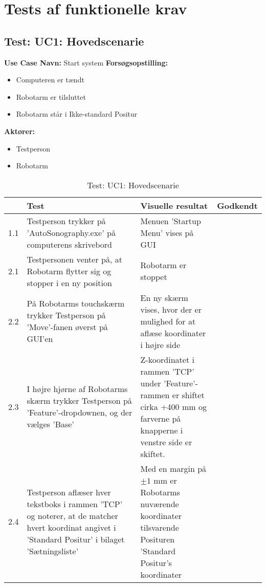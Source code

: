 \chapter{Tests af funktionelle krav}\label{Funktionellekrav}

\section{Test: UC1: Hovedscenarie}
\textbf{Use Case Navn:} Start system \newline
\textbf{Forsøgsopstilling:}
\begin{itemize}
\item Computeren er tændt
\item Robotarm er tilsluttet
\item Robotarm står i Ikke-standard Positur
\end{itemize}  
\textbf{Aktører:}
\begin{itemize}
\item Testperson
\item Robotarm
\end{itemize}  

\begin{table}[htb]
\begin{tabularx}{\textwidth}{|p{0.5cm}|X|X|p{2cm}|}
\hline
\textbf{} & \textbf{Test} & \textbf{Visuelle resultat} &\textbf{Godkendt}
\\
\hline
1.1 &  Testperson trykker på 'AutoSonography.exe' på computerens skrivebord & Menuen 'Startup Menu' vises på GUI &\\\hline
2.1 &  Testpersonen venter på, at Robotarm flytter sig og stopper i en ny position & Robotarm er stoppet & \\\hline
2.2 &  På Robotarms touchskærm trykker Testperson på 'Move'-fanen øverst på GUI'en & En ny skærm vises, hvor der er mulighed for at aflæse koordinater i højre side & \\ \hline
2.3 &  I højre hjørne af Robotarms skærm trykker Testperson på 'Feature'-dropdownen, og der vælges 'Base' & Z-koordinatet i rammen 'TCP' under 'Feature'-rammen er shiftet cirka $+$400 mm og farverne på knapperne i venstre side er skiftet. & \\ \hline
2.4 & Testperson aflæser hver tekstboks i rammen 'TCP' og noterer, at de matcher hvert koordinat angivet i 'Standard Positur' i bilaget 'Sætningsliste' & Med en margin på $ \pm 1$ mm er Robotarms nuværende koordinater tilsvarende Posituren 'Standard Positur's koordinater & \\ \hline
\end{tabularx}
    \caption{Test: UC1: Hovedscenarie}
    \label{uc1_test_h_label}  
\end{table}
\newpage

